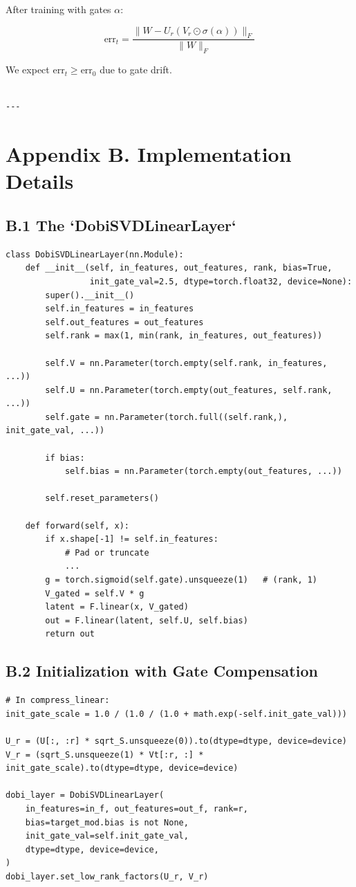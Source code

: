 After training with gates $\alpha$:

\[
\text{err}_t = \frac{\|W - U_r (V_r \odot \sigma(\alpha))\|_F}{\|W\|_F}
\tag{A.9}
\]

We expect $\text{err}_t \geq \text{err}_0$ due to gate drift.
\begin{lstlisting}

---
\end{lstlisting}


\section{Appendix B. Implementation Details}

\subsection{B.1 The `DobiSVDLinearLayer`}

\begin{lstlisting}
class DobiSVDLinearLayer(nn.Module):
    def __init__(self, in_features, out_features, rank, bias=True,
                 init_gate_val=2.5, dtype=torch.float32, device=None):
        super().__init__()
        self.in_features = in_features
        self.out_features = out_features
        self.rank = max(1, min(rank, in_features, out_features))
        
        self.V = nn.Parameter(torch.empty(self.rank, in_features, ...))
        self.U = nn.Parameter(torch.empty(out_features, self.rank, ...))
        self.gate = nn.Parameter(torch.full((self.rank,), init_gate_val, ...))
        
        if bias:
            self.bias = nn.Parameter(torch.empty(out_features, ...))
        
        self.reset_parameters()
    
    def forward(self, x):
        if x.shape[-1] != self.in_features:
            # Pad or truncate
            ...
        g = torch.sigmoid(self.gate).unsqueeze(1)   # (rank, 1)
        V_gated = self.V * g
        latent = F.linear(x, V_gated)
        out = F.linear(latent, self.U, self.bias)
        return out
\end{lstlisting}

\subsection{B.2 Initialization with Gate Compensation}

\begin{lstlisting}
# In compress_linear:
init_gate_scale = 1.0 / (1.0 / (1.0 + math.exp(-self.init_gate_val)))

U_r = (U[:, :r] * sqrt_S.unsqueeze(0)).to(dtype=dtype, device=device)
V_r = (sqrt_S.unsqueeze(1) * Vt[:r, :] * init_gate_scale).to(dtype=dtype, device=device)

dobi_layer = DobiSVDLinearLayer(
    in_features=in_f, out_features=out_f, rank=r,
    bias=target_mod.bias is not None,
    init_gate_val=self.init_gate_val,
    dtype=dtype, device=device,
)
dobi_layer.set_low_rank_factors(U_r, V_r)
\end{lstlisting}

